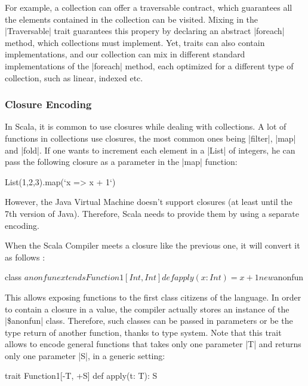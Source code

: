 For example, a collection can offer a traversable contract, which guarantees all the elements contained in the collection can be visited. Mixing in the |Traversable| trait guarantees this propery by declaring an abstract |foreach| method, which collections must implement. Yet, traits can also contain implementations, and our collection can mix in different standard implementations of the |foreach| method, each optimized for a different type of collection, such as linear, indexed etc.

\subsubsection{Closure Encoding}

In Scala, it is common to use closures while dealing with collections. A lot of functions in collections use closures, the most common ones being |filter|, |map| and |fold|. If one wants to increment each element in a |List| of integers, he can pass the following closure as a parameter in the |map| function:

\begin{lstlisting-nobreak}
 List(1,2,3).map(`x => x + 1`)
\end{lstlisting-nobreak}

However, the Java Virtual Machine doesn't support closures (at least until the 7th version of Java). Therefore, Scala needs to provide them by using a separate encoding.

When the Scala Compiler meets a closure like the previous one, it will convert it as follows :

\begin{lstlisting-nobreak}
 {
  class $anonfun extends Function1[Int, Int] {
    def apply(x: Int) = x + 1
  }

  new $anonfun
 }
\end{lstlisting-nobreak}

This allows exposing functions to the first class citizens of the language. In order to contain a closure in a value, the compiler actually stores an instance of the |\$anonfun| class. Therefore, such classes can be passed in parameters or be the type return of another function, thanks to type system. Note that this trait allows to encode general functions that takes only one parameter |T| and returns only one parameter |S|, in a generic setting:

\begin{lstlisting-nobreak}
 trait Function1[-T, +S] {
   def apply(t: T): S
 }
\end{lstlisting-nobreak}

